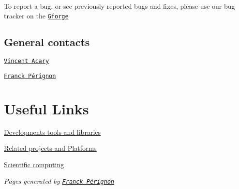 To report a bug, or see previously reported bugs and fixes, please use our bug tracker on the \href{https://gforge.inria.fr/tracker/?group_id=9}{\tt Gforge} \hypertarget{index_gencontact}{}\subsection{General contacts}\label{index_gencontact}
\href{mailto:vincent.acary@ nospam inrialpes.fr}{\tt Vincent Acary}\par
 \href{mailto:franck.perignon@ nospam inrialpes.fr}{\tt Franck P\'{e}rignon}\par
\hypertarget{index_links}{}\section{Useful Links}\label{index_links}
\hyperlink{developments}{Developments tools and libraries} \par
 \hyperlink{related}{Related projects and Platforms} \par
 \hyperlink{scientificComputing}{Scientific computing}

{\em  Pages generated by \href{mailto:franck.perignon@ nospam inrialpes.fr}{\tt Franck P\'{e}rignon} \/} 